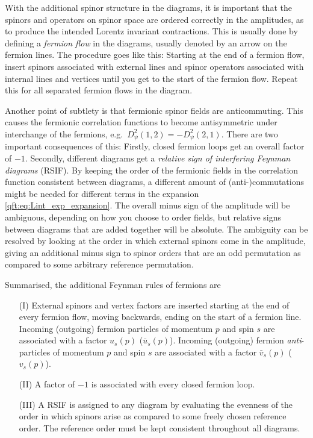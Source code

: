 \documentclass[../main.tex]{subfiles}
\begin{document}
With the additional spinor structure in the diagrams, it is important that the spinors and operators on spinor space are ordered correctly in the amplitudes, as to produce the intended Lorentz invariant contractions.
This is usually done by defining a \emph{fermion flow} in the diagrams, usually denoted by an arrow on the fermion lines.
The procedure goes like this:
Starting at the end of a fermion flow, insert spinors associated with external lines and spinor operators associated with internal lines and vertices until you get to the start of the fermion flow.
Repeat this for all separated fermion flows in the diagram.

Another point of subtlety is that fermionic spinor fields are anticommuting.
This causes the fermionic correlation functions to become antisymmetric under interchange of the fermions, e.g.\ \(D_\psi^2(1, 2) = -D_\psi^2(2, 1)\).
There are two important consequences of this:
Firstly, closed fermion loops get an overall factor of \(-1\).
Secondly, different diagrams get a \emph{relative sign of interfering Feynman diagrams} (RSIF).
By keeping the order of the fermionic fields in the correlation function consistent between diagrams, a different amount of (anti-)commutations might be needed for different terms in the expansion \cref{qft:eq:Lint_exp_expansion}.
The overall minus sign of the amplitude will be ambiguous, depending on how you choose to order fields, but relative signs between diagrams that are added together will be absolute.
The ambiguity can be resolved by looking at the order in which external spinors come in the amplitude, giving an additional minus sign to spinor orders that are an odd permutation as compared to some arbitrary reference permutation.
\medskip

Summarised, the additional Feynman rules of fermions are
\begin{itemize}
  \item [(I)] External spinors and vertex factors are inserted starting at the end of every fermion flow, moving backwards, ending on the start of a fermion line. Incoming (outgoing) fermion particles of momentum \(p\) and spin \(s\) are associated with a factor \(u_s(p)\) (\(\bar{u}_s(p)\)). Incoming (outgoing) fermion \emph{anti}-particles of momentum \(p\) and spin \(s\) are associated with a factor \(\bar{v}_s(p)\) (\(v_s(p)\)).
  \item [(II)] A factor of \(-1\) is associated with every closed fermion loop.
  \item [(III)] A RSIF is assigned to any diagram by evaluating the evenness of the order in which spinors arise as compared to some freely chosen reference order. The reference order must be kept consistent throughout all diagrams.
\end{itemize}
\medskip
\end{document}
